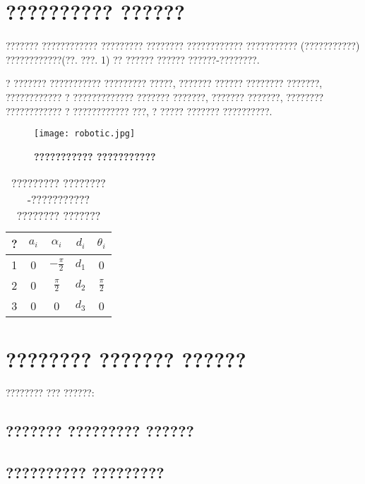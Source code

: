 \section{?????????? ??????}

??????? ???????????? ????????? ???????? ???????????? ??????????? (???????????) ????????????(??. ???. 1)  ?? ?????? ?????? ??????-????????.

? ??????? ??????????? ????????? ?????, ??????? ?????? ???????? ???????, ???????????? ? ????????????? ??????? ???????, ??????? ???????, ???????? ???????????? ? ???????????? ???, ? ????? ??????? ??????????.

\begin{figure}[ht]
	\centering		 
\texttt{[image: robotic.jpg]}	
	\caption{
		\textbf{ ??????????? ???????????
	}
	}     
	\label{fig_img11}
\end{figure}


\begin{table}[h!]
	\caption{????????? ????????-??????????? ???????? ???????} 
	\label{tab_kaw_klass1}
	\centering
	\begin{tabular}{|c|c|c|c|c|}	
		
		\hline ? &$a_i$ &$\alpha_i$ &$d_i$&$\theta_i$ \\
		\hline 1 &0& $-\frac{\pi}{2}$&$d_1$&0\\
		\hline 2 &0& $\frac{\pi}{2}$&$d_2$&$\frac{\pi}{2}$\\
		\hline 3 &0& 0&$d_3$&0\\
		\hline
	\end{tabular} 
\end{table}



\section{???????? ??????? ??????}

???????? ??? ??????: 

\subsection{??????? ????????? ??????}


\subsection{?????????? ?????????}
